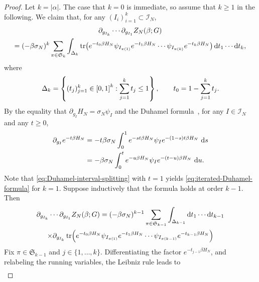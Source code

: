 \documentclass[../CLT_SYK.tex]{subfiles}
\begin{document}
\begin{proof}
  Let $k = |\alpha|$.
  The case that $k=0$ is immediate, so assume that $k \geq 1$ in the following. 
  We claim that, for any $(I_i)_{i=1}^{k} \subset \mathcal I_N$,
  \begin{multline}
    \partial_{g_{I_k}}\cdots\partial_{g_{I_1}}Z_N(\beta;G) \\
    =
      (-\beta\sigma_N)^k
      \sum_{\pi\in \mathfrak{S}_k}\int_{\Delta_k}
      \tr\mleft(
        e^{-t_0\beta H_N}
        \psi_{I_{\pi(1)}}
        e^{-t_1\beta H_N}
        \cdots
        \psi_{I_{\pi(k)}}
        e^{-t_k\beta H_N}
      \mright)
      \odif{t_1}\cdots\odif{t_k},
    \label{eq:iterated-Duhamel-formula}
  \end{multline}
  where
  \[
    \Delta_k =
    \left\{
      (t_j)_{j=1}^{k} \in \interval{0}{1}^k
      :
      \sum_{j=1}^{k} t_j\le 1
    \right\},
    \qquad
    t_0 = 1 - \sum_{j=1}^{k} t_j.
  \]
  By the equality that $\partial_{g_I}H_N = \sigma_N\psi_I$ and the Duhamel formula~\cite[Corollary~3.11]{HiaiPetz2014}, for any $I \in \mathcal I_N$ and any $t \geq 0$,
  \begin{align}
    \partial_{g_I}e^{-t\beta H_N}
    &=
      -t\beta\sigma_N\int_0^1
      e^{-st\beta H_N}\psi_I
      e^{-(1-s)t\beta H_N}\,\odif{s} \notag\\
    &=
      -\beta\sigma_N\int_0^t
      e^{-u\beta H_N}\psi_I
      e^{-(t-u)\beta H_N}\,\odif{u}.
    \label{eq:Duhamel-interval-splitting}
  \end{align}
  Note that  \eqref{eq:Duhamel-interval-splitting} with $t=1$ yields
  \eqref{eq:iterated-Duhamel-formula} for $k=1$.
  Suppose inductively that the formula holds at order $k - 1$.
  Then
  \begin{multline}
    \partial_{g_{I_k}}\cdots\partial_{g_{I_1}}
    Z_N(\beta;G)
    =
      (-\beta\sigma_N)^{k-1}
      \sum_{\pi\in \mathfrak{S}_{k-1}}
      \int_{\Delta_{k-1}} \odif{t_1}\cdots\odif{t_{k-1}} \\
      \times
      \partial_{g_{I_k}}
      \tr\Bigl(
        e^{-t_0\beta H_N}
        \psi_{I_{\pi(1)}}
        e^{-t_1\beta H_N}
        \cdots
        \psi_{I_{\pi(k-1)}}e^{-t_{k-1}\beta H_N}
      \Bigr)
    \label{eq:iterated-Duhamel-formula-induction}
  \end{multline}
  Fix $\pi \in \mathfrak{S}_{k-1}$ and $j\in\{1, \ldots, k\}$.
  Differentiating the factor $e^{-t_{j-1}\beta H_N}$,
  and relabeling the running variables,
  the Leibniz rule leads to
  \begin{align*}

\end{align*}
\end{proof}
\end{document}
